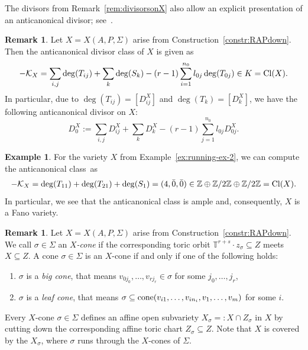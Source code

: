 \documentclass[10pt,a4paper]{amsart}
\theoremstyle{definition}
\newtheorem{exam}[thm]{Example}
\newtheorem{rema}[thm]{Remark}
\def\Cl{{\rm Cl}}
\def\TT{{\mathbb T}}
\def\ZZ{{\mathbb Z}}
\def\cone{{\rm cone}}
\numberwithin{equation}{section}
\begin{document}
The divisors from Remark~\ref{rem:divisorsonX}
also allow an explicit presentation of an anticanonical
divisor; see~\cite[Proposition~3.4.4.1]{ArDeHaLa}.

\begin{rema}
\label{rem:anticanclass}
Let $X = X(A,P,\Sigma)$ arise from
Construction~\ref{constr:RAPdown}.
Then the anticanonical divisor
class of $X$ is given as
\[
- \mathcal{K}_X =
\sum_{i,j} \deg(T_{ij}) + \sum_k \deg(S_k)-
(r-1) \sum_{i=1}^{n_0} l_{0j} \deg(T_{0j})
 \in K =\Cl(X).
\]
In particular, due to $\deg(T_{ij}) = [D^X_{ij}]$
and $\deg(T_k) = [D^X_k]$, we have the
following anticanonical divisor on $X$:
\[
D^X_0
 :=
\sum_{i,j} D^X_{ij} + \sum_k D^X_k
- (r-1) \sum_{j=1}^{n_0} l_{0 j} D^X_{0 j}.
\]
\end{rema}


\begin{exam}
For the variety $X$ from Example~\ref{ex:running-ex-2},
we can compute the anticanonical class~as
\begin{gather*}
- \mathcal{K}_X =
\deg(T_{11})+\deg(T_{21})+\deg(S_1) =
(4,\bar 0, \bar 0) \in
\ZZ \oplus \ZZ/2\ZZ \oplus \ZZ/2\ZZ =\Cl(X).
\end{gather*}
In particular, we see that the anticanonical class
is ample and, consequently, $X$ is a Fano variety.
\end{exam}


\begin{rema}
Let $X = X(A,P,\Sigma)$ arise from
Construction~\ref{constr:RAPdown}.
We call $\sigma \in \Sigma$ an \emph{$X$-cone}
if the corresponding toric
orbit $\TT^{r+s} \cdot z_\sigma \subseteq Z$
meets $X \subseteq Z$.
A cone $\sigma \in \Sigma$ is an $X$-cone
if and only if one of the following holds:
\begin{enumerate}\itemsep=0pt
\item[$(i)$]
$\sigma$ is a \emph{big cone}, that means
$v_{0j_0}, \dots, v_{rj_r} \in \sigma$
for some $j_0, \dots, j_r$,
\item[$(ii)$]
$\sigma$ is a \emph{leaf cone}, that means
$\sigma \subseteq \cone(v_{i1}, \dots, v_{in_i},v_1,\dots,v_m)$
for some $i$.
\end{enumerate}
Every $X$-cone $\sigma \in \Sigma$ defines an affine
open subvariety $X_\sigma =: X \cap Z_\sigma$
in $X$ by cutting down the corresponding affine toric
chart $Z_\sigma \subseteq Z$.
Note that $X$ is covered by the $X_\sigma$, where $\sigma$ runs
through the $X$-cones of $\Sigma$.
\end{rema}
\end{document}
